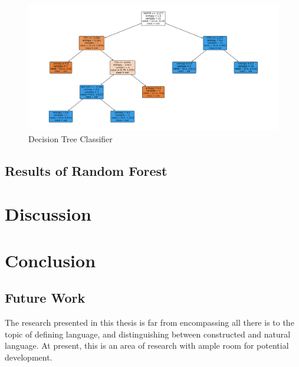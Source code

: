 \documentclass[12pt,a4paper]{article}
\numberwithin{figure}{section}
\numberwithin{table}{section}
\numberwithin{definition}{section}
\begin{document}
\begin{figure}
  \centering
        \includegraphics[width=1.0\textwidth]{decisiontree.png}
        \caption{Decision Tree Classifier}
        \label{fig:decisiontree}
\end{figure}

\subsection{Results of Random Forest}
\label{sec:randomforestresults}

\newpage
\section{Discussion}
\label{sec:discussion}


\newpage
\section{Conclusion}
\label{sec:conclusion}

\subsection{Future Work}
\label{ssec:futurework}

The research presented in this thesis is far from encompassing all there is to the topic of defining language, and distinguishing between constructed and natural language. At present, this is an area of research with ample room for potential development. 
\end{document}
